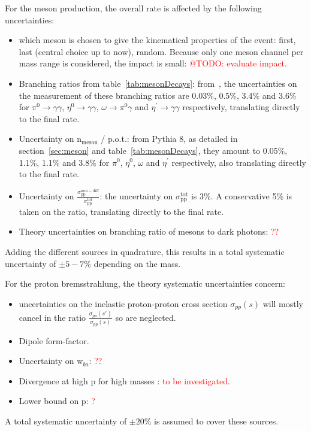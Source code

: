 \documentclass[12pt,a4paper,]{article}
\begin{document}
For the meson production, the overall rate is affected by the
following uncertainties:
\begin{itemize}
\item which meson is chosen to give the kinematical properties of the
  event: first, last (central choice up to now), random. Because only
  one meson channel per mass range is considered, the impact is small:
  \textcolor{red}{@TODO: evaluate impact}.
\item Branching ratios from table~\ref{tab:mesonDecays}:
  from~\cite{Patrignani:2016xqp}, the uncertainties on the measurement
  of these branching ratios are 0.03\%, 0.5\%, 3.4\% and 3.6\% for
  $\pi^0\rightarrow\gamma\gamma$, $\eta^0\rightarrow \gamma\gamma$,
  $\omega\rightarrow \pi^{0}\gamma$ and $\eta^{\prime}\rightarrow
  \gamma\gamma$ respectively, translating directly to the final rate.
\item Uncertainty on n$_{\mathrm{meson}}$ / p.o.t.: from Pythia 8, as
  detailed in section~\ref{sec:meson} and table~\ref{tab:mesonDecays},
  they amount to 0.05\%, 1.1\%, 1.1\% and 3.8\% for $\pi^0$, $\eta^0$,
  $\omega$ and $\eta^{\prime}$ respectively, also translating directly
  to the final rate.
\item Uncertainty on
  $\frac{\sigma_{\mathrm{pp}}^{\mathrm{non-diff}}}{\sigma_{\mathrm{pp}}^{\mathrm{tot}}}$:
  the uncertainty on $\sigma_{\mathrm{pp}}^{\mathrm{tot}}$ is
  3\%. A conservative 5\% is taken on the ratio, translating directly
  to the final rate.
\item Theory uncertainties on branching ratio of mesons to dark
  photons: \textcolor{red}{??}
\end{itemize}
Adding the different sources in quadrature, this results in a total
systematic uncertainty of $\pm 5-7\%$ depending on the mass.

For the proton bremsstrahlung, the theory systematic uncertainties concern:
\begin{itemize}
\item uncertainties on the inelastic proton-proton cross section
  $\sigma_{pp}(s)$ will mostly cancel in the ratio
  $\frac{\sigma_{pp}(s')}{\sigma_{pp}(s)}$ so are neglected.
\item Dipole form-factor.
\item Uncertainty on w$_{ba}$: \textcolor{red}{??}
\item Divergence at high p for high masses : \textcolor{red}{to be investigated}.
\item Lower bound on p: \textcolor{red}{?}
\end{itemize}
A total systematic uncertainty of $\pm 20\%$ is assumed to cover these
sources.
\end{document}
